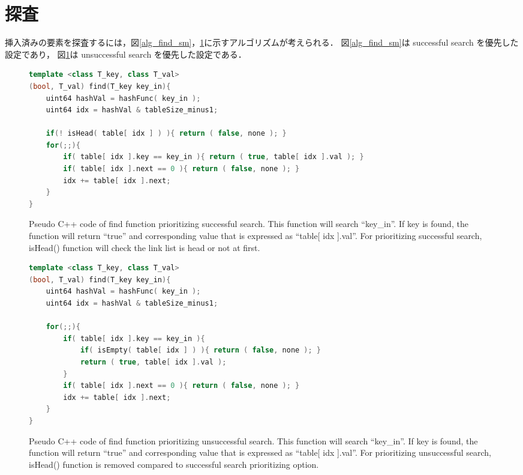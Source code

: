 \section{探査}

挿入済みの要素を探査するには，図\ref{alg_find_sm}，\ref{alg_find_usm}に示すアルゴリズムが考えられる．
図\ref{alg_find_sm}は successful search を優先した設定であり，
図\ref{alg_find_usm}は unsuccessful search を優先した設定である．

\begin{figure}%
\begin{lstlisting}[language=C++]
template <class T_key, class T_val>
(bool, T_val) find(T_key key_in){
	uint64 hashVal = hashFunc( key_in );
	uint64 idx = hashVal & tableSize_minus1;
	
	if(! isHead( table[ idx ] ) ){ return ( false, none ); }
	for(;;){
		if( table[ idx ].key == key_in ){ return ( true, table[ idx ].val ); }
		if( table[ idx ].next == 0 ){ return ( false, none ); }
		idx += table[ idx ].next;
	}
}
\end{lstlisting}
\caption{
  Pseudo C++ code of find function prioritizing successful search.
  This function will search ``key\_in''.
  If key is found, the function will return ``true'' and corresponding value that is expressed as ``table[ idx ].val''.
  For prioritizing successful search, isHead() function will check the link list is head or not at first.
}
\label{alg_find_sm}
\begin{lstlisting}[language=C++]
template <class T_key, class T_val>
(bool, T_val) find(T_key key_in){
	uint64 hashVal = hashFunc( key_in );
	uint64 idx = hashVal & tableSize_minus1;
	
	for(;;){
		if( table[ idx ].key == key_in ){
			if( isEmpty( table[ idx ] ) ){ return ( false, none ); }
			return ( true, table[ idx ].val );
		}
		if( table[ idx ].next == 0 ){ return ( false, none ); }
		idx += table[ idx ].next;
	}
}
\end{lstlisting}
\caption{
  Pseudo C++ code of find function prioritizing unsuccessful search.
  This function will search ``key\_in''.
  If key is found, the function will return ``true'' and corresponding value that is expressed as ``table[ idx ].val''.
  For prioritizing unsuccessful search, isHead() function is removed compared to successful search prioritizing option.
}
\label{alg_find_usm}
\end{figure}

